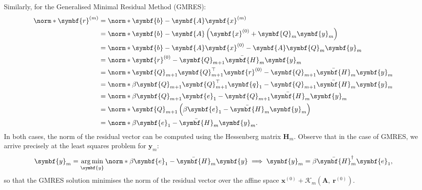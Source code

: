 \documentclass{article}
\DeclareMathOperator{\argmin}{arg\, min}
\begin{document}
Similarly, for the Generalised Minimal Residual Method (GMRES):
\begin{align*}
    \norm*{\symbf{r}^{\left( m \right)}} & = \norm*{\symbf{b} - \symbf{A} \symbf{x}^{\left( m \right)}}                                                                \\
                                         & = \norm*{\symbf{b} - \symbf{A} \left( \symbf{x}^{\left( 0 \right)} + \symbf{Q}_m \symbf{y}_m \right)}                       \\
                                         & = \norm*{\symbf{b} - \symbf{A} \symbf{x}^{\left( 0 \right)} - \symbf{A} \symbf{Q}_m \symbf{y}_m}                            \\
                                         & = \norm*{\symbf{r}^{\left( 0 \right)} - \symbf{Q}_{m+1} \bar{\symbf{H}}_m \symbf{y}_m}                                      \\
                                         & = \norm*{\symbf{Q}_{m+1} \symbf{Q}_{m+1}^\top \symbf{r}^{\left( 0 \right)} - \symbf{Q}_{m+1} \bar{\symbf{H}}_m \symbf{y}_m} \\
                                         & = \norm*{\beta \symbf{Q}_{m+1} \symbf{Q}_{m+1}^\top \symbf{q}_1 - \symbf{Q}_{m+1} \bar{\symbf{H}}_m \symbf{y}_m}            \\
                                         & = \norm*{\beta \symbf{Q}_{m+1} \symbf{e}_1 - \symbf{Q}_{m+1} \bar{\symbf{H}}_m \symbf{y}_m}            \\
                                         & = \norm*{\symbf{Q}_{m+1} \left( \beta \symbf{e}_1 - \bar{\symbf{H}}_m \symbf{y}_m \right)}            \\
                                         & = \norm*{\beta \symbf{e}_1 - \bar{\symbf{H}}_m \symbf{y}_m}.
\end{align*}
In both cases, the norm of the residual vector can be computed using
the Hessenberg matrix \(\symbf{H}_m\).
Observe that in the case of GMRES, we arrive precisely at the least
squares problem for \(\symbf{y}_m\):
\begin{equation*}
    \symbf{y}_m = \argmin_{\symbf{y}} \norm*{\beta \symbf{e}_1 - \bar{\symbf{H}}_m \symbf{y}} \implies \symbf{y}_m = \beta \bar{\symbf{H}}_m^\dagger \symbf{e}_1,
\end{equation*}
so that the GMRES solution minimises the norm of the residual vector
over the affine space \(\symbf{x}^{\left( 0 \right)} + \mathcal{K}_m\left( \symbf{A},\: \symbf{r}^{\left( 0 \right)} \right)\).
\end{document}
